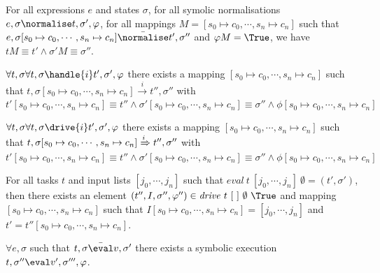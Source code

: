 \begin{lemma}
  \label{lem:soundnorm}

  For all expressions $e$ and states $\sigma$,
  for all symolic normalisations $e,\sigma\normalise t,\sigma',\phi$,
  for all mappings $M=[s_0\mapsto c_0,\cdots,s_n\mapsto c_n]$
  such that $e,\sigma [s_0\mapsto c_0,\cdots,s_n\mapsto c_n] \bar{\normalise}t',\sigma''$ and $\phi M =\True$,
  we have $t M \equiv t' \wedge \sigma' M \equiv \sigma''$.

\end{lemma}

\begin{lemma}
  $\forall t,\sigma \forall t,\sigma\handle{i} t',\sigma',\phi$
  there exists a mapping $[s_0\mapsto c_0,\cdots,s_n\mapsto c_n]$
  such that $t,\sigma [s_0\mapsto c_0,\cdots,s_n\mapsto c_n] \xrightarrow[]{i} t'',\sigma''$
  with $t'[s_0\mapsto c_0,\cdots,s_n\mapsto c_n] \equiv t'' \wedge \sigma' [s_0\mapsto c_0,\cdots,s_n\mapsto c_n] \equiv \sigma'' \wedge \phi [s_0\mapsto c_0,\cdots,s_n\mapsto c_n]$
\end{lemma}


\begin{lemma}
  $\forall t,\sigma \forall t,\sigma\drive{i} t',\sigma',\phi$
  there exists a mapping $[s_0\mapsto c_0,\cdots,s_n\mapsto c_n]$
  such that $t,\sigma [s_0\mapsto c_0,\cdots,s_n\mapsto c_n] \xRightarrow[]{i} t'',\sigma''$
  with $t'[s_0\mapsto c_0,\cdots,s_n\mapsto c_n] \equiv t'' \wedge \sigma' [s_0\mapsto c_0,\cdots,s_n\mapsto c_n] \equiv \sigma'' \wedge \phi [s_0\mapsto c_0,\cdots,s_n\mapsto c_n]$
\end{lemma}


\begin{theorem}
For all tasks $t$ and input lists $[j_0,\cdots,j_n]$ such that $\mathit{eval}\ t\ [j_0,\cdots,j_n]\ \emptyset = (t',\sigma')$,
then there exists an element $(t'',I,\sigma'',\phi'')\in \mathit{drive}\ t\ [\ ]\ \emptyset\ \True$ and mapping $[s_0\mapsto c_0,\cdots,s_n\mapsto c_n]$ such that
$I[s_0\mapsto c_0,\cdots,s_n\mapsto c_n]=[j_0,\cdots,j_n]$ and $t'=t''[s_0\mapsto c_0,\cdots,s_n\mapsto c_n]$.
  \label{thm:complete}
\end{theorem}


\begin{lemma}
  $\forall e,\sigma$ such that $t,\sigma \bar{\eval}v,\sigma'$
  there exists a symbolic execution $t,\sigma''\eval v',\sigma''',\phi$.
\end{lemma}

